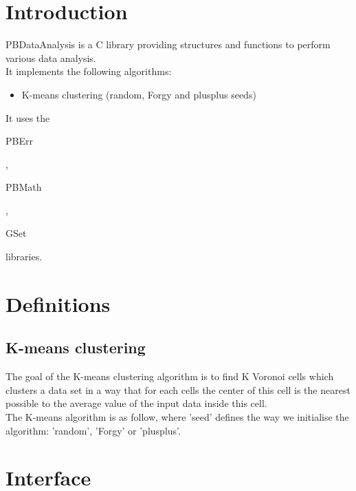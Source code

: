 \section*{Introduction}

PBDataAnalysis is a C library providing structures and functions to perform various data analysis.\\ 

It implements the following algorithms:
\begin{itemize}
\item K-means clustering (random, Forgy and plusplus seeds)
\end{itemize}

It uses the \begin{ttfamily}PBErr\end{ttfamily}, \begin{ttfamily}PBMath\end{ttfamily}, \begin{ttfamily}GSet\end{ttfamily} libraries.\\

\section{Definitions}

\subsection{K-means clustering}

The goal of the K-means clustering algorithm is to find K Voronoi cells which clusters a data set in a way that for each cells the center of this cell is the nearest possible to the average value of the input data inside this cell.\\

The K-means algorithm is as follow, where 'seed' defines the way we initialise the algorithm: 'random', 'Forgy' or 'plusplus'.\\

\begin{scriptsize}
\begin{ttfamily}

\end{ttfamily}
\end{scriptsize}

\section{Interface}

